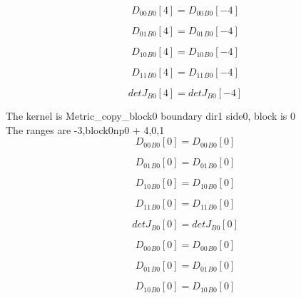 \documentclass{article}
\begin{document}
\begin{dmath}{D_{00}{_{B0}}}[{4}] = {D_{00}{_{B0}}}[{-4}]\end{dmath}

\begin{dmath}{D_{01}{_{B0}}}[{4}] = {D_{01}{_{B0}}}[{-4}]\end{dmath}

\begin{dmath}{D_{10}{_{B0}}}[{4}] = {D_{10}{_{B0}}}[{-4}]\end{dmath}

\begin{dmath}{D_{11}{_{B0}}}[{4}] = {D_{11}{_{B0}}}[{-4}]\end{dmath}

\begin{dmath}{detJ{_{B0}}}[{4}] = {detJ{_{B0}}}[{-4}]\end{dmath}

\noindent The kernel is Metric_copy_block0 boundary dir1 side0, block is 0\\\noindent The ranges are -3,block0np0 + 4,0,1\\\begin{dmath}{D_{00}{_{B0}}}[{0}] = {D_{00}{_{B0}}}[{0}]\end{dmath}

\begin{dmath}{D_{01}{_{B0}}}[{0}] = {D_{01}{_{B0}}}[{0}]\end{dmath}

\begin{dmath}{D_{10}{_{B0}}}[{0}] = {D_{10}{_{B0}}}[{0}]\end{dmath}

\begin{dmath}{D_{11}{_{B0}}}[{0}] = {D_{11}{_{B0}}}[{0}]\end{dmath}

\begin{dmath}{detJ{_{B0}}}[{0}] = {detJ{_{B0}}}[{0}]\end{dmath}

\begin{dmath}{D_{00}{_{B0}}}[{0}] = {D_{00}{_{B0}}}[{0}]\end{dmath}

\begin{dmath}{D_{01}{_{B0}}}[{0}] = {D_{01}{_{B0}}}[{0}]\end{dmath}

\begin{dmath}{D_{10}{_{B0}}}[{0}] = {D_{10}{_{B0}}}[{0}]\end{dmath}
\end{document}
